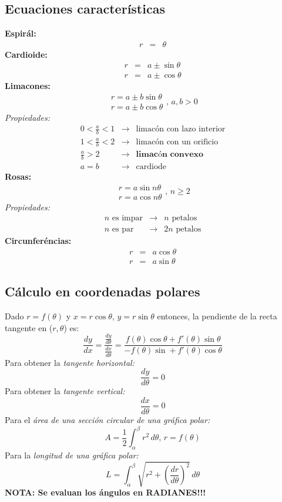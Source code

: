 \documentclass[letterpaper, 12pt]{article}
\begin{document}
        \subsection{Ecuaciones características}
        \textbf{Espirál:}
        \[\begin{matrix}
            r&=&\theta
        \end{matrix}\]
        \textbf{Cardioide:}
        \[\begin{matrix}
            r&=&a\pm\sin\theta\\
            r&=&a\pm\cos\theta
        \end{matrix}\]
        \textbf{Limacones:}
        \[\begin{matrix}
            r=a\pm b\sin\theta\\
            r=a\pm b\cos\theta
        \end{matrix},\, a,b>0\]
        \emph{Propiedades:}
        \[\begin{matrix}
            0<\frac{a}{b}<1&\rightarrow&\text{limacón con lazo interior}\\
            1<\frac{a}{b}<2&\rightarrow&\text{limacón con un orificio}\\
            \frac{a}{b}>2&\rightarrow&\textbf{limacón convexo}\\
            a=b&\rightarrow&\text{cardiode}
        \end{matrix}\]
        \textbf{Rosas:}
        \[\begin{matrix}
            r=a\sin n\theta\\
            r=a\cos n\theta
        \end{matrix},\, n\geq 2\]
        \emph{Propiedades: }
        \[\begin{matrix}
            n \text{ es impar}&\rightarrow& n \text{ petalos}\\
            n \text{ es par}&\rightarrow& 2n \text{ petalos}
        \end{matrix}\]
        \textbf{Circunferéncias:}
        \[\begin{matrix}
            r&=&a\cos\theta\\
            r&=&a\sin\theta
        \end{matrix}\]
        \subsection{Cálculo en coordenadas polares}
        Dado \(r=f(\theta)\) y \(x=r\cos\theta\), \(y=r\sin\theta\) entonces, la pendiente de la recta tangente en (\(r,\theta\)) es:
        \[\frac{dy}{dx}=\frac{\frac{dy}{d\theta}}{\frac{dx}{d\theta}}=\frac{f(\theta)\cos\theta+f'(\theta)\sin\theta}{-f(\theta)\sin+f'(\theta)\cos\theta}\]
        Para obtener la \emph{tangente horizontal:}
        \[\frac{dy}{d\theta}=0\]
        Para obtener la \emph{tangente vertical:}
        \[\frac{dx}{d\theta}=0\]
        Para el \emph{área de una sección circular de una gráfica polar:}
        \[A=\frac{1}{2}\int_{\alpha}^{\beta} r^2\, d\theta,\, r=f(\theta)\]
        Para la \emph{longitud de una gráfica polar:}
        \[L=\int_{\alpha}^{\beta}\sqrt{r^2+\left(\frac{dr}{d\theta}\right)^2}\, d\theta\]
        \textbf{NOTA: Se evaluan los ángulos en RADIANES!!!}
\end{document}
